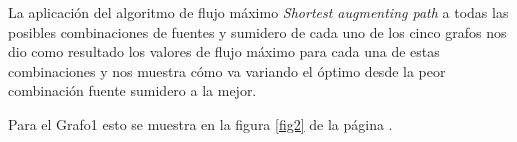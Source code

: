 \documentclass{article}
\begin{document}
La aplicación del algoritmo de flujo máximo \textit{Shortest augmenting path} a todas las posibles combinaciones de fuentes y sumidero de cada uno de los cinco grafos nos dio como resultado los valores de flujo máximo para cada una de estas combinaciones y nos muestra cómo va variando el óptimo desde la peor combinación fuente sumidero a la mejor.

Para el Grafo1 esto se muestra en la figura \ref{fig2} de la página \pageref{fig2}.

\begin{figure}[htbp]


\end{figure}
\end{document}
